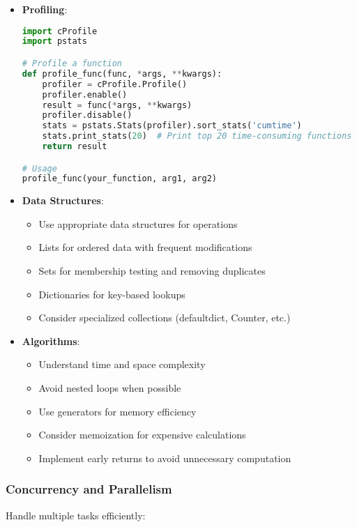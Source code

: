 \begin{itemize}
    \item \textbf{Profiling}:
    \begin{lstlisting}[language=python]
import cProfile
import pstats

# Profile a function
def profile_func(func, *args, **kwargs):
    profiler = cProfile.Profile()
    profiler.enable()
    result = func(*args, **kwargs)
    profiler.disable()
    stats = pstats.Stats(profiler).sort_stats('cumtime')
    stats.print_stats(20)  # Print top 20 time-consuming functions
    return result

# Usage
profile_func(your_function, arg1, arg2)
    \end{lstlisting}
    
    \item \textbf{Data Structures}:
    \begin{itemize}
        \item Use appropriate data structures for operations
        \item Lists for ordered data with frequent modifications
        \item Sets for membership testing and removing duplicates
        \item Dictionaries for key-based lookups
        \item Consider specialized collections (defaultdict, Counter, etc.)
    \end{itemize}
    
    \item \textbf{Algorithms}:
    \begin{itemize}
        \item Understand time and space complexity
        \item Avoid nested loops when possible
        \item Use generators for memory efficiency
        \item Consider memoization for expensive calculations
        \item Implement early returns to avoid unnecessary computation
    \end{itemize}
\end{itemize}

\subsubsection{Concurrency and Parallelism}
Handle multiple tasks efficiently:

